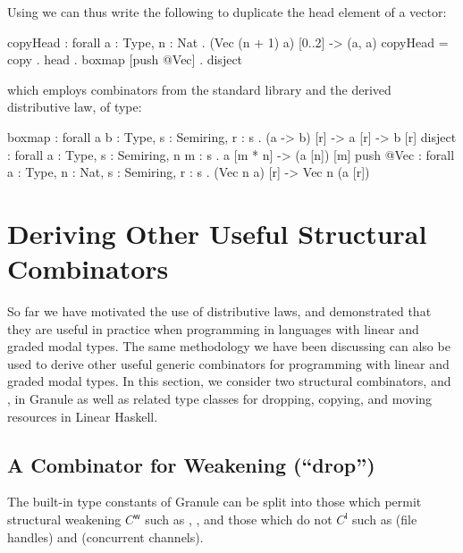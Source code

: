  Using  we can thus write the following to duplicate
 the head element of a vector:
\begin{granule}
copyHead : forall { a : Type, n : Nat } 
         . (Vec (n + 1) a) [0..2] -> (a, a)
copyHead = copy . head . boxmap [push @Vec] . disject
\end{granule}
 which employs combinators from the standard library and
 the derived distributive law, of type:
\begin{granule}
boxmap    : forall { a b : Type, s : Semiring, r : s } 
          . (a  -> b) [r] -> a [r] -> b [r]
disject   : forall { a : Type, s : Semiring, n m : s }   
          . a [m * n] -> (a [n]) [m]
push @Vec : forall { a : Type, n : Nat, s : Semiring, r : s } 
          . (Vec n a) [r] -> Vec n (a [r])
\end{granule}

\section{Deriving Other Useful Structural Combinators}
\label{sec:deriving-other}
So far we have motivated the use of distributive laws, and demonstrated that
they are useful in practice when programming in languages with linear and graded
modal types. The same methodology we have been discussing can also be used to
derive other useful generic combinators for programming with linear and graded
modal types. In this section, we consider two structural combinators,
 and , in Granule as well as related type classes
for dropping, copying, and moving resources in Linear Haskell.

\subsection{A Combinator for Weakening (``drop'')}
\label{subsec:drop}

%
The built-in type constants of Granule can be split into those which permit
structural weakening $C^{\mathsf{w}}$ such as , , and those which do not $C^{\mathsf{l}}$ such as 
(file handles) and  (concurrent channels). 

